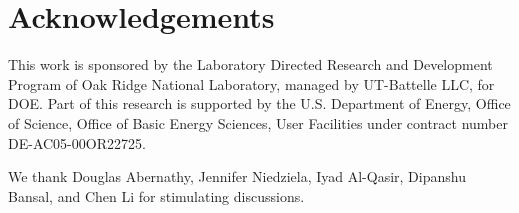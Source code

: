 \documentclass{article}
\begin{document}
\section{Acknowledgements}\label{acknowledgements}
This work is sponsored by the Laboratory Directed Research and
Development Program of Oak Ridge National Laboratory, managed by
UT-Battelle LLC, for DOE. Part of this research is supported by the U.S.
Department of Energy, Office of Science, Office of Basic Energy
Sciences, User Facilities under contract number DE-AC05-00OR22725.

We thank Douglas Abernathy, Jennifer Niedziela, Iyad Al-Qasir, 
Dipanshu Bansal, and Chen Li for stimulating discussions.




\end{document}
